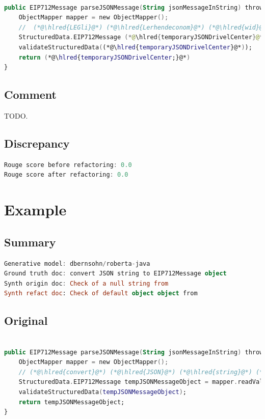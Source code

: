 \documentclass[usenames,dvipsnames]{article} %
\DeclareRobustCommand{\hlred}[1]{{\sethlcolor{pink}\hl{#1}}}
\begin{document}
\begin{lstlisting}[language=kotlin]

public EIP712Message parseJSONMessage(String jsonMessageInString) throws IOException, RuntimeException {
    ObjectMapper mapper = new ObjectMapper();
    //  (*@\hlred{LEGli}@*) (*@\hlred{Lerhendeconom}@*) (*@\hlred{wid}@*)
    StructuredData.EIP712Message (*@\hlred{temporaryJSONDrivelCenter}@*) = mapper.readValue(jsonMessageInString, EIP712Message.class);
    validateStructuredData((*@\hlred{temporaryJSONDrivelCenter}@*));
    return (*@\hlred{temporaryJSONDrivelCenter;}@*)
}
\end{lstlisting}

\subsection{Comment}

TODO.

\subsection{Discrepancy}

\begin{lstlisting}[language=kotlin]
Rouge score before refactoring: 0.0
Rouge score after refactoring: 0.0
\end{lstlisting}



\pagebreak
\section{Example}
\subsection{Summary}

\begin{lstlisting}[language=kotlin]
Generative model: dbernsohn/roberta-java
Ground truth doc: convert JSON string to EIP712Message object
Synth origin doc: Check of a null string from
Synth refact doc: Check of default object object from
\end{lstlisting}

\subsection{Original}
\begin{lstlisting}[language=kotlin]

public EIP712Message parseJSONMessage(String jsonMessageInString) throws IOException, RuntimeException {
    ObjectMapper mapper = new ObjectMapper();
    // (*@\hlred{convert}@*) (*@\hlred{JSON}@*) (*@\hlred{string}@*) (*@\hlred{to}@*) (*@\hlred{EIP712Message}@*) (*@\hlred{object}@*)
    StructuredData.EIP712Message tempJSONMessageObject = mapper.readValue(jsonMessageInString, EIP712Message.class);
    validateStructuredData(tempJSONMessageObject);
    return tempJSONMessageObject;
}
\end{lstlisting}
\end{document}
